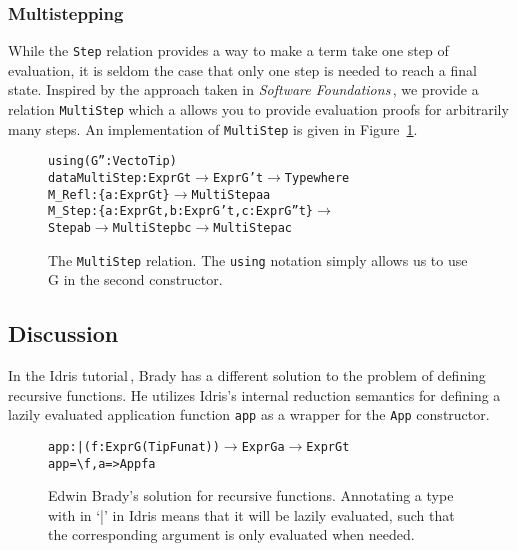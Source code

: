 

\subsubsection{Multistepping}
While the \texttt{Step} relation provides a way to make a term take one step of evaluation, it is seldom the case that only one step is needed to reach a final state. Inspired by the approach taken in \textit{Software Foundations}\,\cite{Pierce:SF}, we provide a relation \texttt{MultiStep} which a allows you to provide evaluation proofs for arbitrarily many steps. An implementation of \texttt{MultiStep} is given in Figure~\ref{fig:MultiStep}.

\begin{figure}
\begin{alltt}
using (G'': Vect o Tip)
  data MultiStep : Expr G t \(\to\) Expr G' t \(\to\) Type where
     M_Refl : \{a: Expr G t\} \(\to\) MultiStep a a
     M_Step : \{a: Expr G t, b: Expr G' t, c: Expr G'' t\} \(\to\) 
              Step a b \(\to\) MultiStep b c \(\to\) MultiStep a c
\end{alltt}
\caption{The \texttt{MultiStep} relation. The \texttt{using} notation simply allows us to use G in the second constructor.}
\label{fig:MultiStep}
\end{figure}

\subsection{Discussion}

In the Idris tutorial\,\cite{Brady:IdrisTutorial}, Brady has a different solution to the problem of defining recursive functions. He utilizes Idris's internal reduction semantics for defining a lazily evaluated application function \texttt{app} as a wrapper for the \texttt{App} constructor. 

\begin{figure}
\begin{alltt}
app : |(f : Expr G (TipFun a t)) \(\to\) Expr G a \(\to\) Expr G t
app = \textbackslash{f}, a => App f a
\end{alltt}
\caption{Edwin Brady's solution for recursive functions. Annotating a type with in `|' in Idris means that it will be lazily evaluated, such that the corresponding argument is only evaluated when needed.}
\end{figure}

